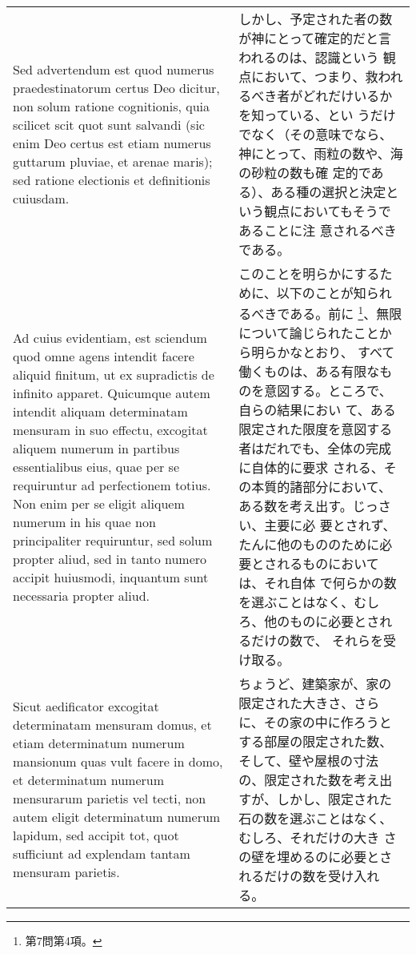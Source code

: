 \documentclass[10pt]{jsarticle} %
\begin{document}
\begin{longtable}{p{21em}p{21em}}
Sed advertendum est quod numerus
praedestinatorum certus Deo dicitur, non solum ratione cognitionis, quia
scilicet scit quot sunt salvandi (sic enim Deo certus est etiam numerus
guttarum pluviae, et arenae maris); sed ratione electionis et
definitionis cuiusdam. 


&

しかし、予定された者の数が神にとって確定的だと言われるのは、認識という
観点において、つまり、救われるべき者がどれだけいるかを知っている、とい
うだけでなく（その意味でなら、神にとって、雨粒の数や、海の砂粒の数も確
定的である）、ある種の選択と決定という観点においてもそうであることに注
意されるべきである。

\\


Ad cuius evidentiam, est sciendum quod omne agens
intendit facere aliquid finitum, ut ex supradictis de infinito
apparet. Quicumque autem intendit aliquam determinatam mensuram in suo
effectu, excogitat aliquem numerum in partibus essentialibus eius, quae
per se requiruntur ad perfectionem totius. Non enim per se eligit
aliquem numerum in his quae non principaliter requiruntur, sed solum
propter aliud, sed in tanto numero accipit huiusmodi, inquantum sunt
necessaria propter aliud. 


&

このことを明らかにするために、以下のことが知られるべきである。前に
\footnote{第7問第4項。}、無限について論じられたことから明らかなとおり、
すべて働くものは、ある有限なものを意図する。ところで、自らの結果におい
て、ある限定された限度を意図する者はだれでも、全体の完成に自体的に要求
される、その本質的諸部分において、ある数を考え出す。じっさい、主要に必
要とされず、たんに他のもののために必要とされるものにおいては、それ自体
で何らかの数を選ぶことはなく、むしろ、他のものに必要とされるだけの数で、
それらを受け取る。

\\


Sicut aedificator excogitat determinatam
mensuram domus, et etiam determinatum numerum mansionum quas vult facere
in domo, et determinatum numerum mensurarum parietis vel tecti, non
autem eligit determinatum numerum lapidum, sed accipit tot, quot
sufficiunt ad explendam tantam mensuram parietis. 


&

ちょうど、建築家が、家の限定された大きさ、さらに、その家の中に作ろうと
する部屋の限定された数、そして、壁や屋根の寸法の、限定された数を考え出
すが、しかし、限定された石の数を選ぶことはなく、むしろ、それだけの大き
さの壁を埋めるのに必要とされるだけの数を受け入れる。


\end{longtable}
\end{document}
